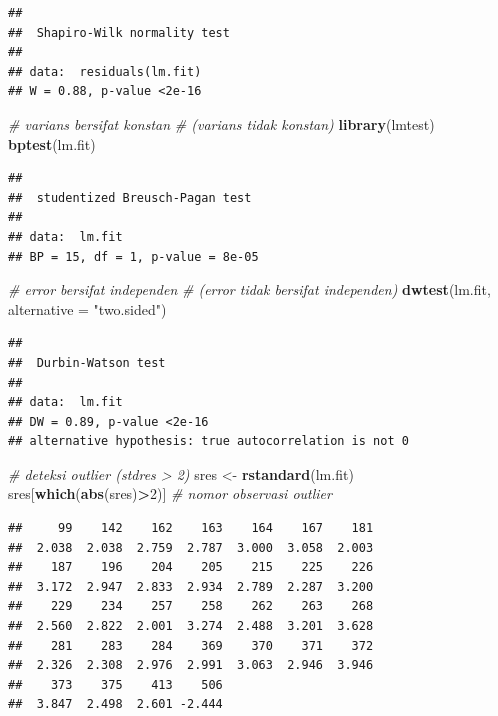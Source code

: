 \documentclass[]{book}
\newenvironment{Shaded}{\begin{snugshade}}{\end{snugshade}}
\newcommand{\CommentTok}[1]{\textcolor[rgb]{0.56,0.35,0.01}{\textit{#1}}}
\newcommand{\DataTypeTok}[1]{\textcolor[rgb]{0.13,0.29,0.53}{#1}}
\newcommand{\DecValTok}[1]{\textcolor[rgb]{0.00,0.00,0.81}{#1}}
\newcommand{\KeywordTok}[1]{\textcolor[rgb]{0.13,0.29,0.53}{\textbf{#1}}}
\newcommand{\NormalTok}[1]{#1}
\newcommand{\OperatorTok}[1]{\textcolor[rgb]{0.81,0.36,0.00}{\textbf{#1}}}
\newcommand{\StringTok}[1]{\textcolor[rgb]{0.31,0.60,0.02}{#1}}
\theoremstyle{definition}
\theoremstyle{definition}
\theoremstyle{definition}
\theoremstyle{remark}
\begin{document}
\begin{verbatim}
## 
##  Shapiro-Wilk normality test
## 
## data:  residuals(lm.fit)
## W = 0.88, p-value <2e-16
\end{verbatim}

\begin{Shaded}
\begin{Highlighting}[]
\CommentTok{# varians bersifat konstan }
\CommentTok{# (varians tidak konstan)}
\KeywordTok{library}\NormalTok{(lmtest)}
\KeywordTok{bptest}\NormalTok{(lm.fit)}
\end{Highlighting}
\end{Shaded}

\begin{verbatim}
## 
##  studentized Breusch-Pagan test
## 
## data:  lm.fit
## BP = 15, df = 1, p-value = 8e-05
\end{verbatim}

\begin{Shaded}
\begin{Highlighting}[]
\CommentTok{# error bersifat independen}
\CommentTok{# (error tidak bersifat independen)}
\KeywordTok{dwtest}\NormalTok{(lm.fit, }\DataTypeTok{alternative =} \StringTok{"two.sided"}\NormalTok{)}
\end{Highlighting}
\end{Shaded}

\begin{verbatim}
## 
##  Durbin-Watson test
## 
## data:  lm.fit
## DW = 0.89, p-value <2e-16
## alternative hypothesis: true autocorrelation is not 0
\end{verbatim}

\begin{Shaded}
\begin{Highlighting}[]
\CommentTok{# deteksi outlier (stdres > 2)}
\NormalTok{sres <-}\StringTok{ }\KeywordTok{rstandard}\NormalTok{(lm.fit)}
\NormalTok{sres[}\KeywordTok{which}\NormalTok{(}\KeywordTok{abs}\NormalTok{(sres)}\OperatorTok{>}\DecValTok{2}\NormalTok{)] }\CommentTok{# nomor observasi outlier}
\end{Highlighting}
\end{Shaded}

\begin{verbatim}
##     99    142    162    163    164    167    181 
##  2.038  2.038  2.759  2.787  3.000  3.058  2.003 
##    187    196    204    205    215    225    226 
##  3.172  2.947  2.833  2.934  2.789  2.287  3.200 
##    229    234    257    258    262    263    268 
##  2.560  2.822  2.001  3.274  2.488  3.201  3.628 
##    281    283    284    369    370    371    372 
##  2.326  2.308  2.976  2.991  3.063  2.946  3.946 
##    373    375    413    506 
##  3.847  2.498  2.601 -2.444
\end{verbatim}
\end{document}
